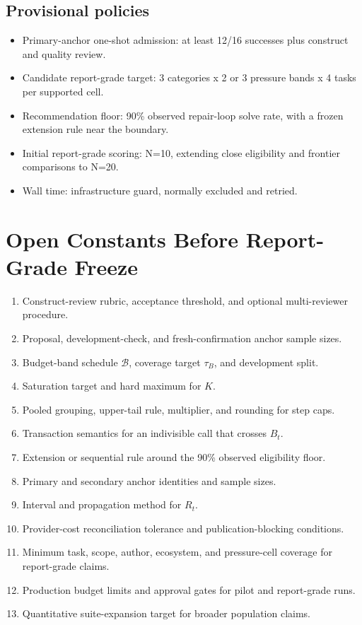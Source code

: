 \documentclass[11pt]{article}
\newcommand{\appendixsection}[2]{\section{#2}}
\begin{document}
\subsection{Provisional policies}\hypertarget{a2-provisional-policies}{}\label{a2-provisional-policies}

\begin{itemize}
\item{} Primary-anchor one-shot admission: at least 12/16 successes plus construct and quality review.
\item{} Candidate report-grade target: 3 categories x 2 or 3 pressure bands x 4 tasks per supported cell.
\item{} Recommendation floor: 90\% observed repair-loop solve rate, with a frozen extension rule near the boundary.
\item{} Initial report-grade scoring: N=10, extending close eligibility and frontier comparisons to N=20.
\item{} Wall time: infrastructure guard, normally excluded and retried.
\end{itemize}

\appendixsection{B}{Open Constants Before Report-Grade Freeze}\hypertarget{appendix-b-open-constants-before-report-grade-freeze}{}\label{appendix-b-open-constants-before-report-grade-freeze}

\begin{enumerate}
\item{} Construct-review rubric, acceptance threshold, and optional multi-reviewer procedure.
\item{} Proposal, development-check, and fresh-confirmation anchor sample sizes.
\item{} Budget-band schedule $\mathcal B$, coverage target $\tau_B$, and development split.
\item{} Saturation target and hard maximum for $K$.
\item{} Pooled grouping, upper-tail rule, multiplier, and rounding for step caps.
\item{} Transaction semantics for an indivisible call that crosses $B_t$.
\item{} Extension or sequential rule around the 90\% observed eligibility floor.
\item{} Primary and secondary anchor identities and sample sizes.
\item{} Interval and propagation method for $R_t$.
\item{} Provider-cost reconciliation tolerance and publication-blocking conditions.
\item{} Minimum task, scope, author, ecosystem, and pressure-cell coverage for report-grade claims.
\item{} Production budget limits and approval gates for pilot and report-grade runs.
\item{} Quantitative suite-expansion target for broader population claims.
\end{enumerate}
\end{document}
